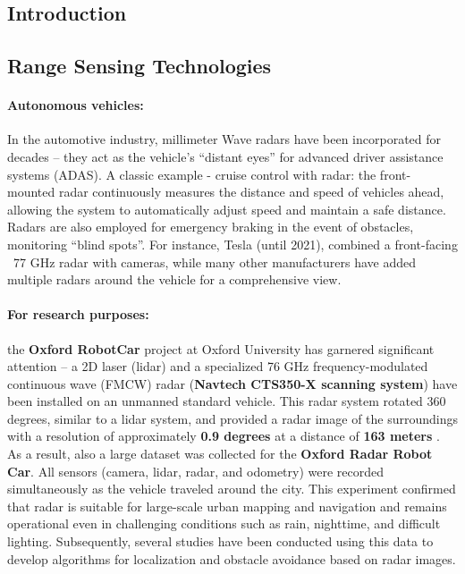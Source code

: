 

\subsection{Introduction}
\subsection{Range Sensing Technologies}




\paragraph{Autonomous vehicles:} In the automotive industry, millimeter Wave radars have been incorporated for decades – they act as the vehicle’s “distant eyes” for advanced driver assistance systems (ADAS). A classic example - cruise control with radar: the front-mounted radar continuously measures the distance and speed of vehicles ahead, allowing the system to automatically adjust speed and maintain a safe distance. Radars are also employed for emergency braking in the event of obstacles, monitoring “blind spots”. For instance, Tesla (until 2021), combined a front-facing ~77 GHz radar with cameras, while many other manufacturers have added multiple radars around the vehicle for a comprehensive view. 
\paragraph{For research purposes:} the \textbf{Oxford RobotCar} project at Oxford University has garnered significant attention – a 2D laser (lidar) and a specialized 76 GHz frequency-modulated continuous wave (FMCW) radar (\textbf{Navtech CTS350-X scanning system}) have been installed on an unmanned standard vehicle.\citep{Barnes2020RadarRobotCar}
This radar system rotated 360 degrees, similar to a lidar system, and provided a radar image of the surroundings with a resolution of approximately \textbf{0.9 degrees} at a distance of \textbf{163 meters}   .
As a result, also a large dataset was collected for the \textbf{Oxford Radar Robot Car}. All sensors (camera, lidar, radar, and odometry) were recorded simultaneously as the vehicle traveled around the city.
This experiment confirmed that radar is suitable for large-scale urban mapping and navigation and remains operational even in challenging conditions such as rain, nighttime, and difficult lighting. Subsequently, several studies have been conducted using this data to develop algorithms for localization and obstacle avoidance based on radar images.

